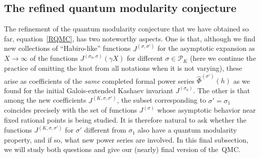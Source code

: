 \documentclass[pdftex]{sigma}
\numberwithin{equation}{section}
\def\calP{\mathcal P}
\def\calP{\mathcal P}
\def\Phih{\widehat\Phi}
\def\s{\sigma}
\def\J{\mathbf J} \def\J{J} %
\def\g{\gamma}
\begin{document}
\subsection{The refined quantum modularity conjecture}
\label{sub.4.5}

The refinement of the quantum modularity conjecture that we have obtained so far,
equation~\eqref{RQMC}, has two noteworthy aspects. One is that, although we find
new collections of ``Habiro-like'' functions $\J^{(\s,\s')}$ for the asymptotic
expansion as $X\to\infty$ of the functions $\J^{(\s_0,\s)}(\g X)$ for different
$\s\in\calP_K$ (here we continue the practice of omitting the knot from all
notations when it is not varying), these arise as coefficients of the \emph{same}
completed formal power series $\Phih^{(\s')}(h)$ as we found for the initial
Galois-extended Kashaev invariant $\J^{(\s_0)}$. The other is that among the new
coefficients $\J^{(K,\s,\s')}$, the subset corresponding to $\s'=\s_1$ coincides
precisely with the set of functions $\J^{(\s)}$ whose asymptotic behavior near fixed
rational points is being studied. It is therefore natural to ask whether the
functions $\J^{(K,\s,\s')}$ for $\s'$ different from $\s_1$ also have a quantum
modularity property, and if so, what new power series are involved. In this final
subsection, we will study both questions and give our (nearly) final version of the~QMC.
\end{document}
